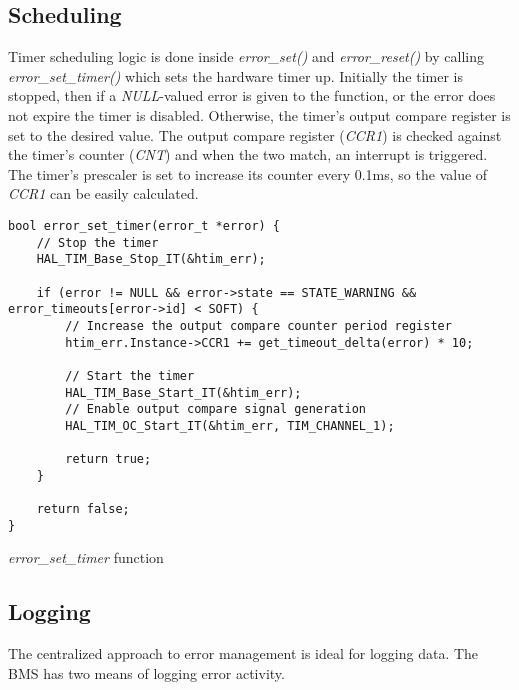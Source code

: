 \subsection{Scheduling}
Timer scheduling logic is done inside \textit{error\_set()} and \textit{error\_reset()} by calling \textit{error\_set\_timer()} which sets the hardware timer up.
Initially the timer is stopped, then if a \textit{NULL}-valued error is given to the function, or the error does not expire the timer is disabled. Otherwise, the timer's output compare register is set to the desired value. The output compare register (\textit{CCR1}) is checked against the timer's counter (\textit{CNT}) and when the two match, an interrupt is triggered. The timer's prescaler is set to increase its counter every 0.1ms, so the value of \textit{CCR1} can be easily calculated.
\begin{listing}[h]
	\begin{verbatim}
bool error_set_timer(error_t *error) {
	// Stop the timer
	HAL_TIM_Base_Stop_IT(&htim_err);

	if (error != NULL && error->state == STATE_WARNING && error_timeouts[error->id] < SOFT) {
		// Increase the output compare counter period register
		htim_err.Instance->CCR1 += get_timeout_delta(error) * 10;

		// Start the timer
		HAL_TIM_Base_Start_IT(&htim_err);
		// Enable output compare signal generation
		HAL_TIM_OC_Start_IT(&htim_err, TIM_CHANNEL_1);

		return true;
	}

	return false;
}
	\end{verbatim}
	\caption{\textit{error\_set\_timer} function}
	\label{code:error_set_timer}
\end{listing}

\subsection{Logging}
The centralized approach to error management is ideal for logging data. The BMS has two means of logging error activity.

